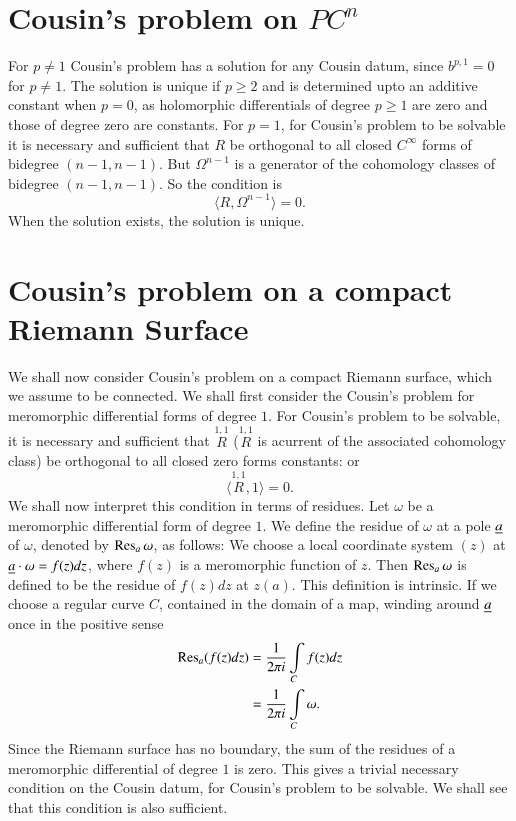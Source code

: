 \section*{Cousin's problem on $PC^{n}$}

For $p\neq 1$ Cousin's problem has a solution for any Cousin datum,
since $b^{p,1}=0$ for $p\neq 1$. The solution is unique if $p\geq 2$
and is determined upto an additive constant when $p=0$, as holomorphic
differentials of degree $p\geq 1$ are zero and those of degree zero
are constants. For $p=1$, for Cousin's problem to be solvable it is
necessary and sufficient that $R$ be orthogonal to all closed
$C^{\infty}$ forms of bidegree $(n-1,n-1)$. But $\Omega^{n-1}$ is a
generator of the cohomology classes of bidegree $(n-1, n-1)$. So the
condition is
$$
\langle R,\Omega^{n-1}\rangle=0.
$$
When the solution exists, the solution is unique.

\section*{Cousin's problem on a compact Riemann Surface}

We shall now consider Cousin's problem on a compact Riemann surface,
which we assume to be connected. We shall first consider the Cousin's
problem for meromorphic differential forms of degree $1$. For Cousin's
problem to be solvable, it is necessary and sufficient that
$\overset{1,1}{R}$ ($\overset{1,1}{R}$ is a\pageoriginale current of
the associated cohomology class) be orthogonal to all closed zero
forms \iec constants: or
$$
\langle \overset{1,1}{R},1\rangle=0.
$$
We shall now interpret this condition in terms of residues. Let
$\omega$ be a meromorphic differential form of degree $1$. We define
the residue of $\omega$ at a pole $\underline{a}$ of $\omega$, denoted by
$\operatorname{Res}_{a}\omega$, as follows: We choose a local coordinate system
$(z)$ at $\underline{a}\cdot \omega=f(z)dz$, where $f(z)$ is a meromorphic
function of $z$. Then $\operatorname{Res}_{a}\omega$ is defined to be the residue of
$f(z)dz$ at $z(a)$. This definition is intrinsic. If we choose a
regular curve $C$, contained in the domain of a map, winding around
$\underline{a}$ once in the positive sense
\begin{align*}
\operatorname{Res}_{a}(f(z)dz) &= \frac{1}{2\pi i}\int\limits_{C}f(z)dz\\
&= \frac{1}{2\pi i}\int\limits_{C}\omega.
\end{align*}
Since the Riemann surface has no boundary, the sum of the residues of
a meromorphic differential of degree $1$ is zero. This gives a trivial
necessary condition on the Cousin datum, for Cousin's problem to be
solvable. We shall see that this condition is also sufficient.

